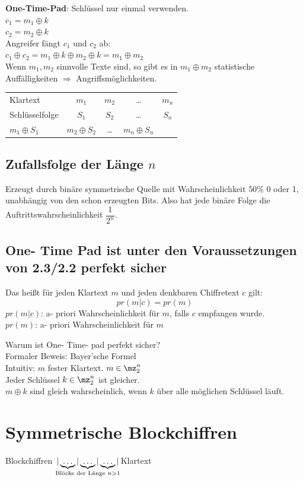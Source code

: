 		\textbf{One-Time-Pad}: Schlüssel nur einmal verwenden.\\
		$c_1=m_1\oplus k$\\
		$c_2=m_2\oplus k$\\
		Angreifer fängt $c_1$ und $c_2$ ab:\\
		$c_1\oplus c_2 = m_1\oplus k\oplus m_2\oplus k=m_1\oplus m_2$\\
		Wenn $m_1,m_2$ sinnvolle Texte sind, so gibt es in $m_1\oplus m_2$ statistische Auffälligkeiten $\Rightarrow$ Angriffsmöglichkeiten.
		
		\begin{tabular}{lcccc}
		Klartext&$m_1$&$m_2$&\dots &$m_n$\\
		Schlüsselfolge&$S_1$&$S_2$&\dots &$S_n$\\
		$m_1\oplus S_1$&$m_2\oplus S_2$&\dots &$m_n\oplus S_n$
		\end{tabular}
		
	\subsection{Zufallsfolge der Länge \texorpdfstring{$n$}{n}}
		Erzeugt durch binäre symmetrische Quelle mit Wahrscheinlichkeit $50\%$ 0 oder 1, unabhängig von den schon erzeugten Bits. Also hat jede binäre Folge die Auftrittswahrscheinlichkeit $\dfrac{1}{2^n}$.
		
	\subsection{One- Time Pad ist unter den Voraussetzungen von 2.3/2.2 perfekt sicher}
		Das heißt für jeden Klartext $m$ und jeden denkbaren Chiffretext $c$ gilt:
		\[pr(m|c)=pr(m)\]
		$pr(m|c)$: a- priori Wahrscheinlichkeit für $m$, falls $c$ empfangen wurde.\\
		$pr(m)$: a- priori Wahrscheinlichkeit für $m$
		
		Warum ist One- Time- pad perfekt sicher?\\
		Formaler Beweis: Bayer'sche Formel\\
		Intuitiv: $m$ fester Klartext. $m\in\mz_2^n$\\
		Jeder Schlüssel $k\in\mz_2^n$ ist gleicher.\\
		$m\oplus k$ sind gleich wahrscheinlich, wenn $k$ über alle möglichen Schlüssel läuft.

\section{Symmetrische Blockchiffren}
	Blockchiffren $\underset{\mbox{\scriptsize Blöcke der Länge }n>1}{|\underbrace{\dots}|\underbrace{\dots}|\underbrace{\dots}|}$\quad Klartext
	

